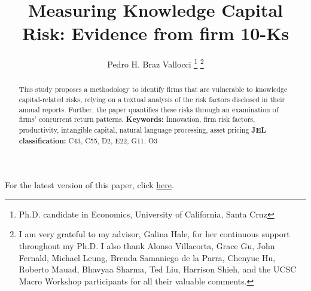 \documentclass[12pt, letterpaper]{article}
\begin{document}
\title{Measuring Knowledge Capital Risk: Evidence from firm 10-Ks}
\author{Pedro H. Braz Vallocci \footnote{Ph.D. candidate in Economics, University of California, Santa Cruz} 
\footnote{I am very grateful to my advisor, Galina Hale, for her continuous support throughout my Ph.D. I also thank Alonso Villacorta, Grace Gu, John Fernald, Michael Leung, Brenda Samaniego de la Parra, Chenyue Hu, Roberto Mauad, Bhavyaa Sharma, Ted Liu, Harrison Shieh, and the UCSC Macro Workshop participants for all their valuable comments.}} %

\newcommand{\ffo}{dicfullmc10thr10defnob40noa1_4t}

\newcommand{\insertfigure}[3]{
\begin{figure}[H]
  \centering
  \texttt{[image: \\ffo/\#1]}
  \caption{#2}
  \label{fig:#1}
\end{figure}
}


\newcommand{\tkk}{$Topic_{kk}$ }

\maketitle 

\begin{center}
For the latest version of this paper, click \href{https://github.com/pbrazval/jmdocs/blob/main/brazvallocci_jmp.pdf}{here}.
\end{center}

\begin{abstract}
    This study proposes a methodology to identify firms that are vulnerable to knowledge capital-related risks, relying on a textual analysis of the risk factors disclosed in their annual reports. Further, the paper quantifies these risks through an examination of firms' concurrent return patterns. \newline \textbf{\indent Keywords:} Innovation, firm risk factors, productivity, intangible capital, natural language processing, asset pricing \newline \textbf{\indent JEL classification:} C43, C55, D2, E22, G11, O3
\end{abstract}
\end{document}
